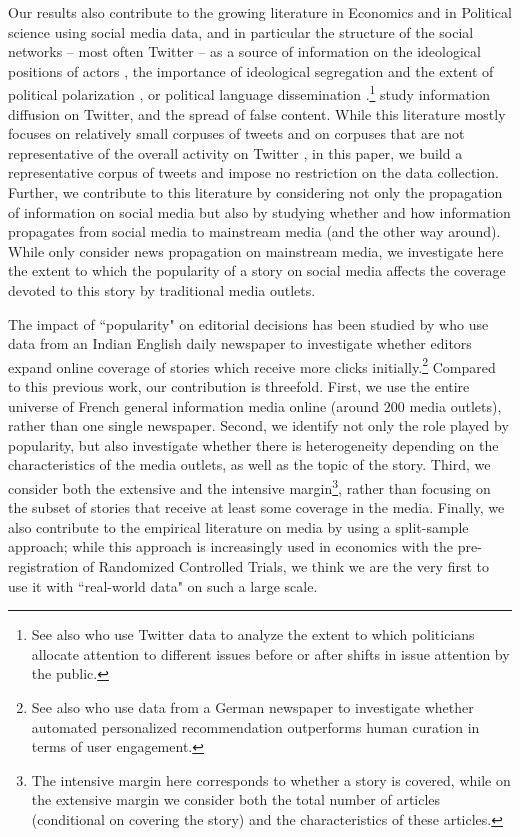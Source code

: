 Our results also contribute to the growing literature in Economics and in Political science using social media data, and in particular the structure of the social networks -- most often Twitter -- as a source of information on the ideological positions of actors \citep{Barbera2015,cardon2019unfolding}, the importance of ideological segregation and the extent of political polarization \citep{HalberstamKnight2016,Giavazzietal2020}, or political language dissemination \citep{Longhietal2019}.\footnote{See also \citet{Barberaetal2019} who use Twitter data to analyze the extent to which politicians allocate attention to different issues before or after shifts in issue attention by the public.} \citet{Gorodnichenkoetal2018} study information diffusion on Twitter, and \citet{AllcottGentzkowYu2019_ReasearchPolitics} the spread of false content. While this literature mostly focuses on relatively small corpuses of tweets and on corpuses that are not representative of the overall activity on Twitter \citep[e.g.][make requests to collect tweets using Brexit-related keywords]{Gorodnichenkoetal2018}, in this paper, we build a representative corpus of tweets and impose no restriction on the data collection. Further, we contribute to this literature by considering not only the propagation of information on social media but also by studying whether and how information propagates from social media to mainstream media (and the other way around). While \citet{CageHerveViaud2020} only consider news propagation on mainstream media, we investigate here the extent to which the popularity of a story on social media affects the coverage devoted to this story by traditional media outlets.

The impact of ``popularity" on editorial decisions has been studied by \citet{SenYildirim2015} who use data from an Indian English daily newspaper to investigate whether editors expand online coverage of stories which receive more clicks initially.\footnote{See also \citet{ClaussenPeukertSen2019} who use data from a German newspaper to investigate whether automated personalized recommendation outperforms human curation in terms of user engagement.} Compared to this previous work, our contribution is threefold. First, we use the entire universe of French general information media online (around $200$ media outlets), rather than one single newspaper. Second, we identify not only the role played by popularity, but also investigate whether there is heterogeneity depending on the characteristics of the media outlets, as well as the topic of the story. Third, we consider both the extensive and the intensive  margin\footnote{The intensive margin here corresponds to whether a story is covered, while on the extensive margin we consider both the total number of articles (conditional on covering the story) and the characteristics of these articles.}, rather than focusing on the subset of stories that receive at least some coverage in the media. Finally, we also contribute to the empirical literature on media by using a split-sample approach; while this approach is increasingly used in economics with the pre-registration of Randomized Controlled Trials, we think we are the very first to use it with ``real-world data" on such a large scale.

